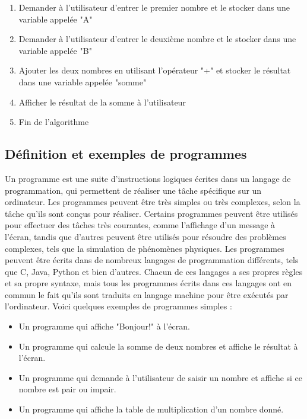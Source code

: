 \documentclass{uofa-eng-assignment}
\begin{document}
\begin{enumerate}
    \item Demander à l'utilisateur d'entrer le premier nombre et le stocker dans une variable appelée "A"
    \item Demander à l'utilisateur d'entrer le deuxième nombre et le stocker dans une variable appelée "B"
    \item Ajouter les deux nombres en utilisant l'opérateur "+" et stocker le résultat dans une variable appelée "somme"
    \item Afficher le résultat de la somme à l'utilisateur
    \item Fin de l'algorithme
\end{enumerate}

\subsection{Définition et exemples de programmes}
Un programme est une suite d'instructions logiques écrites dans un langage de programmation, qui permettent de réaliser une tâche spécifique sur un ordinateur.
\newline \newline
Les programmes peuvent être très simples ou très complexes, selon la tâche qu'ils sont conçus pour réaliser. Certains programmes peuvent être utilisés pour effectuer des tâches très courantes, comme l'affichage d'un message à l'écran, tandis que d'autres peuvent être utilisés pour résoudre des problèmes complexes, tels que la simulation de phénomènes physiques.
\newline \newline
Les programmes peuvent être écrits dans de nombreux langages de programmation différents, tels que C, Java, Python et bien d'autres. Chacun de ces langages a ses propres règles et sa propre syntaxe, mais tous les programmes écrits dans ces langages ont en commun le fait qu'ils sont traduits en langage machine pour être exécutés par l'ordinateur.
\newline \newline
Voici quelques exemples de programmes simples :
\begin{itemize}
    \item Un programme qui affiche "Bonjour!" à l'écran.
    \item Un programme qui calcule la somme de deux nombres et affiche le résultat à l'écran.
    \item Un programme qui demande à l'utilisateur de saisir un nombre et affiche si ce nombre est pair ou impair.
    \item Un programme qui affiche la table de multiplication d'un nombre donné.
\end{itemize}
\end{document}
